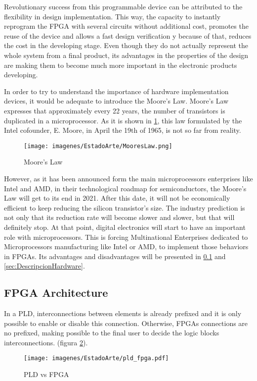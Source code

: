 Revolutionary success from this programmable device can be attributed to the flexibility in design implementation. This way, the capacity to instantly reprogram the FPGA with several circuits without additional cost, promotes the reuse of the device and allows a fast design verification y because of that, reduces the cost in the developing stage. Even though they do not actually represent the whole system from a final product, its advantages in the properties of the design are making them to become much more important in the electronic products developing. \newline

In order to try to understand the importance of hardware implementation devices, it would be adequate to introduce the Moore’s Law. Moore’s Law expresses that approximately every 22 years, the number of transistors is duplicated in a
microprocessor. As it is shown in \ref{fig:Ley_de_Moore}, this law formulated by the Intel cofounder, E. Moore, in April the 19th of 1965, is not so far from reality.
\newline
\begin{figure}[H]
	\center
	\texttt{[image: imagenes/EstadoArte/MooresLaw.png]}
	\caption{Moore's Law}
	\label{fig:Ley_de_Moore}
\end{figure}
 

However, as it has been announced form the main microprocessors enterprises like Intel and AMD, in their technological roadmap for semiconductors, the Moore’s Law will get to its end in 2021. After this date, it will not be economically efficient to keep reducing the silicon transistor’s size. The industry prediction is not only that its reduction rate will become slower and slower, but that will definitely stop. At that point, digital electronics will start to have an important role with microprocessors. This is forcing Multinational Enterprises dedicated to Microprocessors manufacturing like Intel or AMD, to implement those behaviors in FPGAs. Its advantages and disadvantages will be presented in \ref{sec:ArquitecturaFPGA} and \ref{sec:DescripcionHardware}.
\newpage
\subsection{FPGA Architecture}\label{sec:ArquitecturaFPGA}

In a PLD, interconnections between elements is already prefixed and it is only possible to enable or disable this connection. Otherwise, FPGAs connections are no prefixed, making possible to the final user to decide the logic blocks interconnections. (figura \ref{fig:pld_fpga}).
\newline
\begin{center}
\begin{figure}[H]
	\center
	\texttt{[image: imagenes/EstadoArte/pld\_fpga.pdf]}
	\caption{PLD vs FPGA}
	\label{fig:pld_fpga}
\end{figure}

\end{center}


